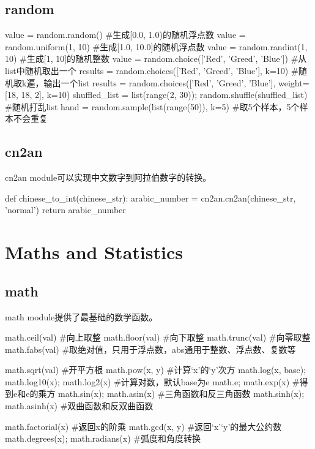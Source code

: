 \documentclass{article}
\begin{document}
    \subsection{random}
      \begin{codeblock}[language=python, caption={random module}]
        value = random.random() #生成[0.0, 1.0)的随机浮点数
        value = random.uniform(1, 10) #生成[1.0, 10.0]的随机浮点数
        value = random.randint(1, 10) #生成[1, 10]的随机整数
        value = random.choice(['Red', 'Greed', 'Blue']) #从list中随机取出一个
        results = random.choices(['Red', 'Greed', 'Blue'], k=10) #随机取k遍，输出一个list
        results = random.choices(['Red', 'Greed', 'Blue'], weight=[18, 18, 2], k=10) 
        shuffled_list = list(range(2, 30)); random.shuffle(shuffled_list) #随机打乱list
        hand = random.sample(list(range(50)), k=5) #取5个样本，5个样本不会重复
      \end{codeblock}

    \subsection{cn2an}
      cn2an module可以实现中文数字到阿拉伯数字的转换。
      \begin{codeblock}[language=python, caption={cn2an}]
        def chinese_to_int(chinese_str):
            arabic_number = cn2an.cn2an(chinese_str, 'normal')
            return arabic_number
      \end{codeblock}

  \section{Maths and Statistics}

    \subsection{math}
      math module提供了最基础的数学函数。
      \begin{codeblock}[language=python, caption={math module}]
        math.ceil(val) #向上取整
        math.floor(val) #向下取整
        math.trunc(val) #向零取整
        math.fabs(val) #取绝对值，只用于浮点数，abs通用于整数、浮点数、复数等

        math.sqrt(val) #开平方根
        math.pow(x, y) #计算`x'的`y'次方
        math.log(x, base); math.log10(x); math.log2(x) #计算对数，默认base为e
        math.e; math.exp(x) #得到e和e的乘方
        math.sin(x); math.asin(x) #三角函数和反三角函数
        math.sinh(x); math.asinh(x) #双曲函数和反双曲函数

        math.factorial(x) #返回x的阶乘
        math.gcd(x, y) #返回`x'`y'的最大公约数
        math.degrees(x); math.radians(x) #弧度和角度转换
      \end{codeblock}
\end{document}
